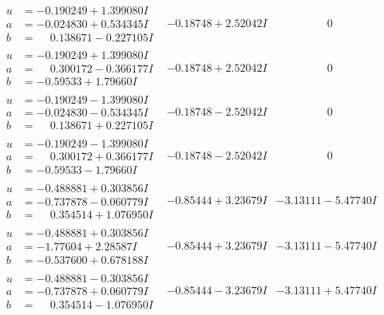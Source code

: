\documentclass[1p]{elsarticle_modified}
\theoremstyle{definition}
\begin{document}
$$\begin{array}{c|c|c}
\begin{aligned}
u &= -0.190249 + 1.399080 I \\
a &= -0.024830 + 0.534345 I \\
b &= \phantom{-}0.138671 - 0.227105 I\end{aligned}
 & -0.18748 + 2.52042 I & \phantom{-0.000000 } 0 \\ \hline\begin{aligned}
u &= -0.190249 + 1.399080 I \\
a &= \phantom{-}0.300172 - 0.366177 I \\
b &= -0.59533 + 1.79660 I\end{aligned}
 & -0.18748 + 2.52042 I & \phantom{-0.000000 } 0 \\ \hline\begin{aligned}
u &= -0.190249 - 1.399080 I \\
a &= -0.024830 - 0.534345 I \\
b &= \phantom{-}0.138671 + 0.227105 I\end{aligned}
 & -0.18748 - 2.52042 I & \phantom{-0.000000 } 0 \\ \hline\begin{aligned}
u &= -0.190249 - 1.399080 I \\
a &= \phantom{-}0.300172 + 0.366177 I \\
b &= -0.59533 - 1.79660 I\end{aligned}
 & -0.18748 - 2.52042 I & \phantom{-0.000000 } 0 \\ \hline\begin{aligned}
u &= -0.488881 + 0.303856 I \\
a &= -0.737878 - 0.060779 I \\
b &= \phantom{-}0.354514 + 1.076950 I\end{aligned}
 & -0.85444 + 3.23679 I & -3.13111 - 5.47740 I \\ \hline\begin{aligned}
u &= -0.488881 + 0.303856 I \\
a &= -1.77604 + 2.28587 I \\
b &= -0.537600 + 0.678188 I\end{aligned}
 & -0.85444 + 3.23679 I & -3.13111 - 5.47740 I \\ \hline\begin{aligned}
u &= -0.488881 - 0.303856 I \\
a &= -0.737878 + 0.060779 I \\
b &= \phantom{-}0.354514 - 1.076950 I\end{aligned}
 & -0.85444 - 3.23679 I & -3.13111 + 5.47740 I \\ \hline\begin{aligned}

\end{aligned}
\end{array}$$
\end{document}
